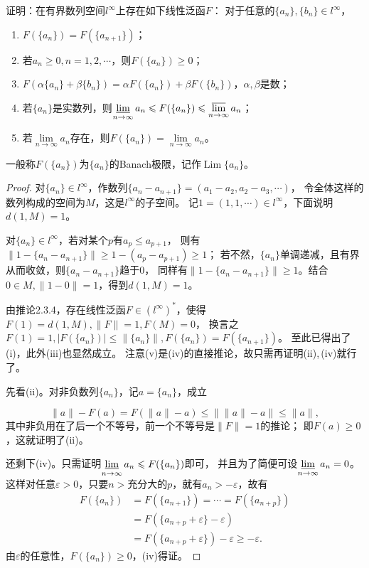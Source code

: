 \begin{9}[Banach极限]
    证明：在有界数列空间$l^\infty$上存在如下线性泛函$F$：
    对于任意的$\{a_n\},\{b_n\} \in l^\infty$，
    \begin{enumerate}[label=(\roman*)]
    \item $F(\{a_n\})=F(\{a_{n+1}\})$；\\
    \item 若$a_n\geqslant0,n=1,2,\cdots$，则$F(\{a_n\})\geqslant0$；\\
    \item $F(\alpha\{a_n\}+\beta\{b_n\})=\alpha F(\{a_n\})+\beta F(\{b_n\})$，$\alpha,\beta$是数；\\
    \item 若$\{a_n\}$是实数列，则$\varliminf\limits_{n\to\infty}a_n \leqslant F(\{a_n\}) \leqslant \varlimsup\limits_{n\to\infty}a_n$；\\
    \item 若$\lim\limits_{n\to\infty}a_n$存在，则$F(\{a_n\})=\lim\limits_{n\to\infty}a_n$。
    \end{enumerate}
    一般称$F(\{a_n\})$为$\{a_n\}$的Banach极限，记作$\operatorname{Lim}\{a_n\}$。
\end{9}
\begin{proof}
    对$\{a_n\} \in l^\infty$，作数列$\{a_n-a_{n+1}\}=(a_1-a_2,a_2-a_3,\cdots)$，
    令全体这样的数列构成的空间为$M$，这是$l^\infty$的子空间。
    记$1=(1,1,\cdots) \in l^\infty$，下面说明$d(1,M)=1$。

    对$\{a_n\} \in l^\infty$，若对某个$p$有$a_p \leqslant a_{p+1}$，
    则有$\|1-\{a_n-a_{n+1}\}\|\geqslant1-(a_p-a_{p+1})\geqslant1$；
    若不然，$\{a_n\}$单调递减，且有界从而收敛，则$\{a_n-a_{n+1}\}$趋于$0$，
    同样有$\|1-\{a_n-a_{n+1}\}\|\geqslant1$。结合$0 \in M,\|1-0\|=1$，得到$d(1,M)=1$。

    由推论2.3.4，存在线性泛函$F\in(l^\infty)^*$，使得$F(1)=d(1,M),\|F\|=1,F(M)=0$，
    换言之$F(1)=1,|F(\{a_n\})|\leqslant\|\{a_n\}\|,F(\{a_n\})=F(\{a_{n+1}\})$。
    至此已得出了(i)，此外(iii)也显然成立。
    注意(v)是(iv)的直接推论，故只需再证明(ii),\,(iv)就行了。

    先看(ii)。对非负数列$\{a_n\}$，记$a=\{a_n\}$，成立

    \[\|a\|-F(a)=F(\|a\|-a)\leqslant\big\|\|a\|-a\big\|\leqslant\|a\|,\]
    其中非负用在了后一个不等号，前一个不等号是$\|F\|=1$的推论；
    即$F(a)\geqslant0$，这就证明了(ii)。

    还剩下(iv)。只需证明$\varliminf\limits_{n\to\infty}a_n \leqslant F(\{a_n\})$即可，
    并且为了简便可设$\varliminf\limits_{n\to\infty}a_n=0$。
    这样对任意$\varepsilon>0$，只要$n>$充分大的$p$，就有$a_n>-\varepsilon$，故有
    \begin{align*}
        F(\{a_n\})&=F(\{a_{n+1}\})=\cdots=F(\{a_{n+p}\})\\
        &=F(\{a_{n+p}+\varepsilon\}-\varepsilon)\\
        &=F(\{a_{n+p}+\varepsilon\})-\varepsilon\geqslant-\varepsilon.
    \end{align*}
    由$\varepsilon$的任意性，$F(\{a_n\})\geqslant0$，(iv)得证。
\end{proof}

